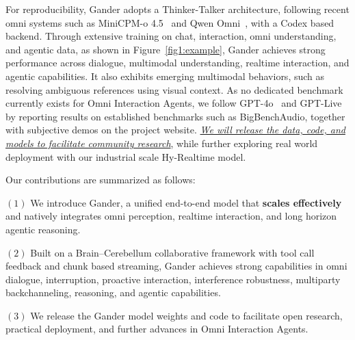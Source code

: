
For reproducibility, Gander adopts a Thinker-Talker architecture, following recent omni systems such as MiniCPM-o 4.5~\cite{cui2026minicpm} and Qwen Omni~\cite{qwen3.5omni,qwen3omni}, with a Codex based backend. Through extensive training on chat, interaction, omni understanding, and agentic data, as shown in Figure~\ref{fig1:example}, Gander achieves strong performance across dialogue, multimodal understanding, realtime interaction, and agentic capabilities. It also exhibits emerging multimodal behaviors, such as resolving ambiguous references using visual context. As no dedicated benchmark currently exists for Omni Interaction Agents, we follow GPT-4o~\cite{hurst2024gpt4o} and GPT-Live~\cite{openai_gpt_live_system_card_2026} by reporting results on established benchmarks such as BigBenchAudio, together with subjective demos on the project website. \underline{\textit{We will release the data, code, and models to facilitate community research}}, while further exploring real world deployment with our industrial scale Hy-Realtime model.


Our contributions are summarized as follows:

$(1)$ We introduce Gander, a unified end-to-end model that \textbf{scales effectively} and natively integrates omni perception, realtime interaction, and long horizon agentic reasoning.

$(2)$ Built on a Brain–Cerebellum collaborative framework with tool call feedback and chunk based streaming, Gander achieves strong capabilities in omni dialogue, interruption, proactive interaction, interference robustness, multiparty backchanneling, reasoning, and agentic capabilities.


$(3)$ We release the Gander model weights and code to facilitate open research, practical deployment, and further advances in Omni Interaction Agents.


